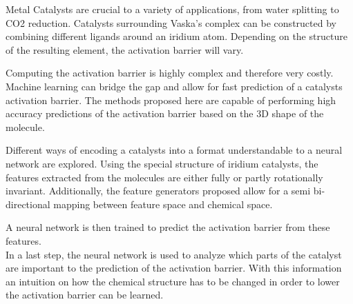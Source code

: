 
\Abstract

Metal Catalysts are crucial to a variety of applications, from water splitting to CO2 reduction. %
Catalysts surrounding Vaska's complex can be constructed by combining different ligands around an iridium atom.
Depending on the structure of the resulting element, the activation barrier will vary.

Computing the activation barrier is highly complex and therefore very costly. 
Machine learning can bridge the gap and allow for fast prediction of a catalysts activation barrier.
The methods proposed here are capable of performing high accuracy predictions of the activation barrier based on
the 3D shape of the molecule.

Different ways of encoding a catalysts into a format understandable to a neural network are explored.
Using the special structure of iridium catalysts, the features extracted from the molecules are either fully or partly rotationally invariant.
Additionally, the feature generators proposed allow for a semi bi-directional mapping between feature space and chemical space.

A neural network is then trained to predict the activation barrier from these features.
\\

In a last step, the neural network is used to analyze which parts of the catalyst are important to the prediction of the activation barrier.
With this information an intuition on how the chemical structure has to be changed in order to lower the activation barrier can be learned.

